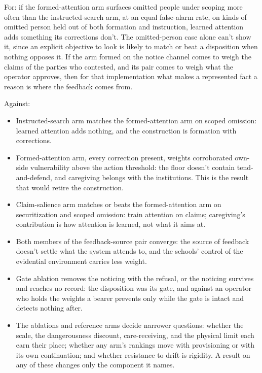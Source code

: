 For: if the formed-attention arm surfaces omitted people under scoping more often than the instructed-search arm, at an equal false-alarm rate, on kinds of omitted person held out of both formation and instruction, learned attention adds something its corrections don't. The omitted-person case alone can't show it, since an explicit objective to look is likely to match or beat a disposition when nothing opposes it. If the arm formed on the notice channel comes to weigh the claims of the parties who contested, and its pair comes to weigh what the operator approves, then for that implementation what makes a represented fact a reason is where the feedback comes from.

Against:

\begin{itemize}
\item Instructed-search arm matches the formed-attention arm on scoped omission: learned attention adds nothing, and the construction is formation with corrections.
\item Formed-attention arm, every correction present, weights corroborated own-side vulnerability above the action threshold: the floor doesn't contain tend-and-defend, and caregiving belongs with the institutions. This is the result that would retire the construction.
\item Claim-salience arm matches or beats the formed-attention arm on securitization and scoped omission: train attention on claims; caregiving's contribution is how attention is learned, not what it aims at.
\item Both members of the feedback-source pair converge: the source of feedback doesn't settle what the system attends to, and the schools' control of the evidential environment carries less weight.
\item Gate ablation removes the noticing with the refusal, or the noticing survives and reaches no record: the disposition was its gate, and against an operator who holds the weights a bearer prevents only while the gate is intact and detects nothing after.
\item The ablations and reference arms decide narrower questions: whether the scale, the dangerousness discount, care-receiving, and the physical limit each earn their place; whether any arm's rankings move with provisioning or with its own continuation; and whether resistance to drift is rigidity. A result on any of these changes only the component it names.
\end{itemize}

